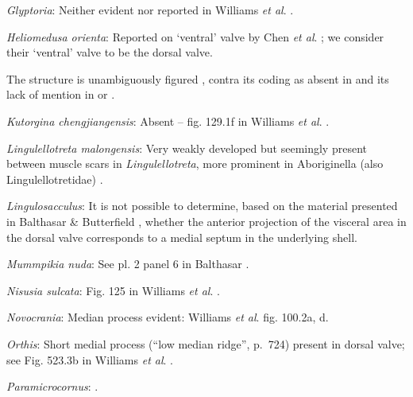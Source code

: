 \documentclass[openany]{book}
\theoremstyle{definition}
\theoremstyle{definition}
\theoremstyle{definition}
\theoremstyle{remark}
\begin{document}
\hypertarget{Glyptoria-coding-95}{}
\emph{Glyptoria}: Neither evident nor reported in Williams \emph{et al}.
\citeyearpar{Williams2000LinguliformeaCraniiformea}.

\hypertarget{Heliomedusa_orienta-coding-95}{}
\emph{Heliomedusa orienta}: Reported on `ventral' valve by Chen \emph{et
al}. \citeyearpar{Chen2007Reinterpretationof}; we consider their
`ventral' valve to be the dorsal valve.

The structure is unambiguously figured \citep[e.g.~fig. 5.1
in][]{Chen2007Reinterpretationof}, contra its coding as absent in
\citet{Williams2000LinguliformeaCraniiformea} and its lack of mention in
\citet{Williams2007Supplement} or \citet{Zhang2009Architectureand}.

\hypertarget{Kutorgina_chengjiangensis-coding-95}{}
\emph{Kutorgina chengjiangensis}: Absent -- fig. 129.1f in Williams
\emph{et al}. \citeyearpar{Williams2000LinguliformeaCraniiformea}.

\hypertarget{Lingulellotreta_malongensis-coding-95}{}
\emph{Lingulellotreta malongensis}: Very weakly developed but seemingly
present between muscle scars in \emph{Lingulellotreta}, more prominent
in Aboriginella (also Lingulellotretidae) \citep[fig.
34]{Williams2000LinguliformeaCraniiformea}.

\hypertarget{Lingulosacculus-coding-95}{}
\emph{Lingulosacculus}: It is not possible to determine, based on the
material presented in Balthasar \& Butterfield
\citeyearpar{Balthasar2009EarlyCambrian}, whether the anterior
projection of the visceral area in the dorsal valve corresponds to a
medial septum in the underlying shell.

\hypertarget{Mummpikia_nuda-coding-95}{}
\emph{Mummpikia nuda}: See pl. 2 panel 6 in Balthasar
\citeyearpar{Balthasar2008iMummpikia}.

\hypertarget{Nisusia_sulcata-coding-95}{}
\emph{Nisusia sulcata}: Fig. 125 in Williams \emph{et al}.
\citeyearpar{Williams2000LinguliformeaCraniiformea}.

\hypertarget{Novocrania-coding-95}{}
\emph{Novocrania}: Median process evident: Williams \emph{et al}.
\citeyearpar{Williams2000LinguliformeaCraniiformea} fig. 100.2a, d.

\hypertarget{Orthis-coding-95}{}
\emph{Orthis}: Short medial process (``low median ridge'', p.~724)
present in dorsal valve; see Fig. 523.3b in Williams \emph{et al}.
\citeyearpar{Williams2000LinguliformeaCraniiformea}.

\hypertarget{Paramicrocornus-coding-95}{}
\emph{Paramicrocornus}: \citet{Zhang2018Ahyolithid}.
\end{document}
